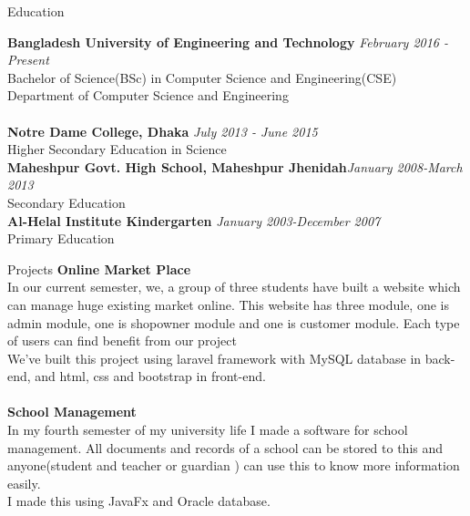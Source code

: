 \documentclass{resume} %
\begin{document}

\begin{rSection}{Education}

{\bf Bangladesh University of Engineering and Technology} \hfill {\em February 2016 - Present} 
\\ Bachelor of Science(BSc) in Computer Science and Engineering(CSE)
\\ Department of Computer Science and Engineering\\
\\{\bf Notre Dame College, Dhaka} \hfill {\em July 2013 - June 2015} 
\\ Higher Secondary Education in Science
\\{\bf Maheshpur Govt. High School, Maheshpur Jhenidah}\hfill {\em January 2008-March 2013 }
\\ Secondary Education
\\{ \bf Al-Helal Institute Kindergarten } \hfill{ \em January 2003-December 2007}
\\ Primary Education


\end{rSection}

\begin{rSection}{Projects}
{\bf Online Market Place}
\\In our current semester, we, a group of three students have built a website which can manage huge existing market online. This website has three module, one is admin module, one is shopowner module and one is customer module. Each type of users can find benefit from our project
\\ We've built this project using laravel framework with MySQL database in back-end, and html, css and bootstrap in front-end.\\
\\{\bf School Management}\\
 In my fourth semester of my university life I made a software for school management. All documents and records of a school can be stored to this and anyone(student and teacher or guardian ) can use this to know more information easily. 
 \\ I made this using JavaFx and Oracle database.


\end{rSection}
\end{document}
